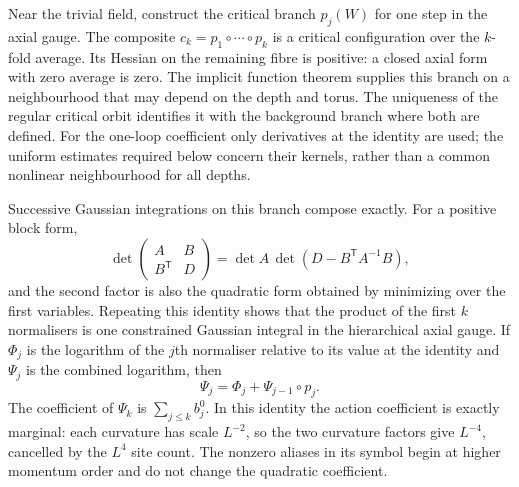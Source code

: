 \documentclass[11pt,letterpaper,reqno]{amsart}
\theoremstyle{definition}
\theoremstyle{remark}
\begin{document}
Near the trivial field, construct the critical branch
$p_j(W)$ for one step in the axial gauge. The composite
$c_k=p_1\circ\cdots\circ p_k$ is a critical configuration
over the $k$-fold average. Its Hessian on the remaining
fibre is positive: a closed axial form with zero average
is zero. The implicit function theorem supplies this
branch on a neighbourhood that may depend on the depth
and torus. The uniqueness of the regular critical orbit
identifies it with the background branch where both are
defined. For the one-loop coefficient only derivatives
at the identity are used; the uniform estimates required
below concern their kernels, rather than a common
nonlinear neighbourhood for all depths.

Successive Gaussian integrations on this branch compose
exactly. For a positive block form,
\[
 \det\begin{pmatrix}A&B\\B^{\mathsf T}&D\end{pmatrix}
       =\det A\,\det(D-B^{\mathsf T}A^{-1}B),
\]
and the second factor is also the quadratic form obtained
by minimizing over the first variables. Repeating this
identity shows that the product of the first $k$
normalisers is one constrained Gaussian integral in the
hierarchical axial gauge. If $\Phi_j$ is the logarithm
of the $j$th normaliser relative to its value at the
identity and $\Psi_j$ is the combined logarithm, then
\[
 \Psi_j=\Phi_j+\Psi_{j-1}\circ p_j.
\]
The coefficient of $\Psi_k$ is $\sum_{j\le k}b_j^0$.
In this identity the action coefficient is exactly
marginal: each curvature has scale $L^{-2}$, so the two
curvature factors give $L^{-4}$, cancelled by the $L^4$
site count. The nonzero aliases in its symbol begin at
higher momentum order and do not change the quadratic
coefficient.
\end{document}
